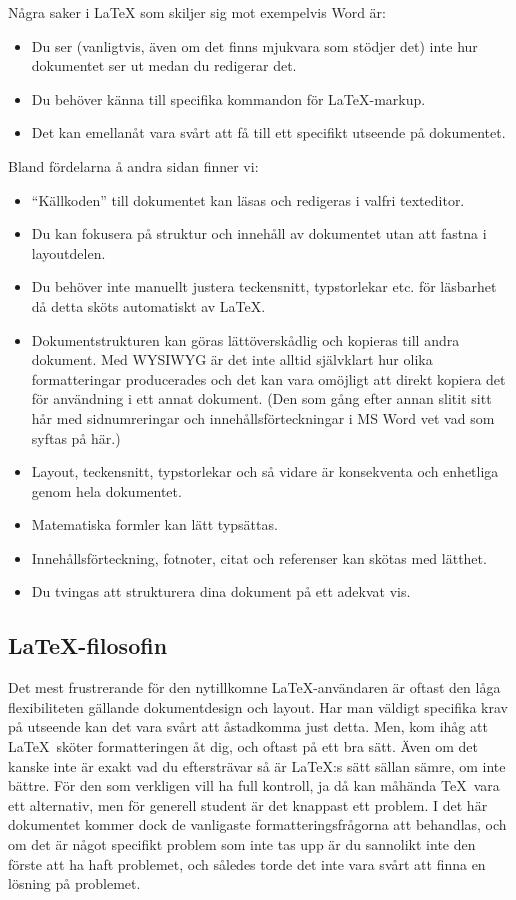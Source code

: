 Några saker i \LaTeX{} som skiljer sig mot exempelvis Word är:
\begin{itemize}
\item Du ser (vanligtvis, även om det finns mjukvara som stödjer det) inte hur dokumentet ser ut medan du redigerar det.
\item Du behöver känna till specifika kommandon för \LaTeX-markup.
\item Det kan emellanåt vara svårt att få till ett specifikt utseende på dokumentet.
\end{itemize}
Bland fördelarna å andra sidan finner vi:
\begin{itemize}
\item ``Källkoden'' till dokumentet kan läsas och redigeras i valfri texteditor.
\item Du kan fokusera på struktur och innehåll av dokumentet utan att fastna i layoutdelen.
\item Du behöver inte manuellt justera teckensnitt, typstorlekar etc. för läsbarhet då detta sköts automatiskt av \LaTeX.
\item Dokumentstrukturen kan göras lättöverskådlig och kopieras till andra dokument. Med WYSIWYG är det inte alltid självklart hur olika formatteringar producerades och det kan vara omöjligt att direkt kopiera det för användning i ett annat dokument. (Den som gång efter annan slitit sitt hår med sidnumreringar och innehållsförteckningar i MS Word vet vad som syftas på här.)
\item Layout, teckensnitt, typstorlekar och så vidare är konsekventa och enhetliga genom hela dokumentet.
\item Matematiska formler kan lätt typsättas.
\item Innehållsförteckning, fotnoter, citat och referenser kan skötas med lätthet.
\item Du tvingas att strukturera dina dokument på ett adekvat vis.
\end{itemize}

\subsection{\LaTeX-filosofin}
Det mest frustrerande för den nytillkomne \LaTeX-användaren är oftast den låga flexibiliteten gällande dokumentdesign och layout. Har man väldigt specifika krav på utseende kan det vara svårt att åstadkomma just detta. Men, kom ihåg att \LaTeX\ sköter formatteringen åt dig, och oftast på ett bra sätt. Även om det kanske inte är exakt vad du eftersträvar så är \LaTeX:s sätt sällan sämre, om inte bättre. För den som verkligen vill ha full kontroll, ja då kan måhända \TeX\ vara ett alternativ, men för generell student är det knappast ett problem. I det här dokumentet kommer dock de vanligaste formatteringsfrågorna att behandlas, och om det är något specifikt problem som inte tas upp är du sannolikt inte den förste att ha haft problemet, och således torde det inte vara svårt att finna en lösning på problemet.

